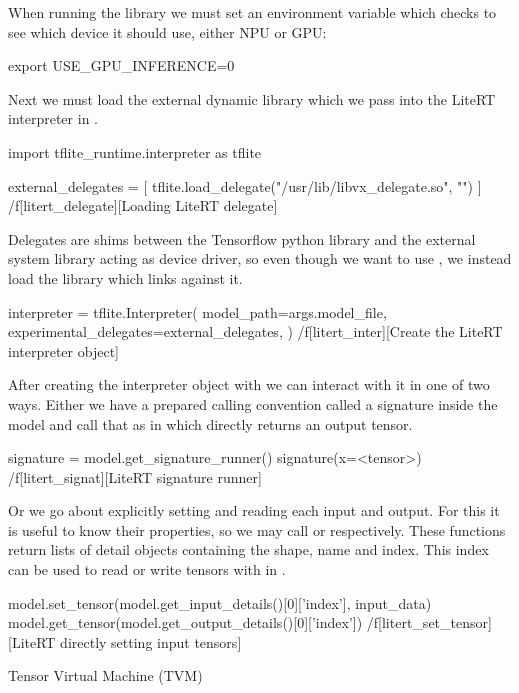 When running the library we must set an environment variable which  checks
to see which device it should use, either NPU or GPU:

\begtt
export USE_GPU_INFERENCE=0
\endtt

Next we must load the external dynamic library
which we pass into the LiteRT interpreter in .

\midinsert
\begtt{}
import tflite_runtime.interpreter as tflite

external_delegates = [
    tflite.load_delegate("/usr/lib/libvx_delegate.so", "")
]
\endtt
\caplabel/f[litert_delegate][Loading LiteRT delegate]
\endinsert

Delegates are shims between the Tensorflow python library
and the external system library acting as device driver,
so even though we want to use ,
we instead load the 
library which links against it.

\midinsert
\begtt{}
interpreter = tflite.Interpreter(
  model_path=args.model_file,
  experimental_delegates=external_delegates,
)
\endtt
\caplabel/f[litert_inter][Create the LiteRT interpreter object]
\endinsert

After creating the interpreter object with 
we can interact with it in one of two ways.
Either we have a prepared calling convention called a signature
inside the model and call that as in 
which directly returns an output tensor.

\midinsert
\begtt {}
signature = model.get_signature_runner()
signature(x=<tensor>)
\endtt
\caplabel/f[litert_signat][LiteRT signature runner]
\endinsert

Or we go about explicitly setting and reading
each input and output.
For this it is useful to know their properties,
so we may call 
or  respectively.
These functions return lists of detail objects
containing the shape, name and index.
This index can be used to read or write tensors
with  in .

\midinsert
\begtt {}
model.set_tensor(model.get_input_details()[0]['index'], input_data)
model.get_tensor(model.get_output_details()[0]['index'])
\endtt
\caplabel/f[litert_set_tensor][LiteRT directly setting input tensors]
\endinsert

\sec Tensor Virtual Machine (TVM)

